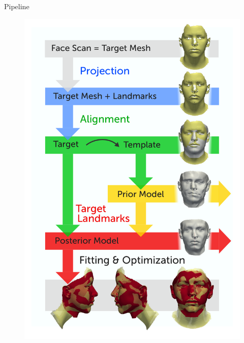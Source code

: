 \documentclass[xcolor=x11names,compress]{beamer}
\begin{document}
    \begin{frame}{Pipeline}
        \begin{figure}
            \includegraphics[width=.9\textwidth]{../resources/figures/pipeline.pdf}
        \end{figure}
    \end{frame}

\end{document}
